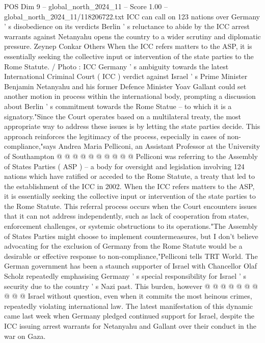 \begin{textsample}{POS Dim 9 – global\_north\_2024\_11 – Score 1.00 – global\_north\_2024\_11/118206722.txt}  \label{ex:f9_pos_244}
ICC can call on 123 nations over Germany ' s disobedience on its verdicts Berlin ' s reluctance to abide by the ICC arrest warrants against Netanyahu opens the country to a wider scrutiny and diplomatic pressure.
Zeynep Conkar Others When the ICC refers matters to the ASP, it is essentially seeking the collective input or intervention of the state parties to the Rome Statute. / Photo : ICC Germany ' s ambiguity towards the latest International Criminal Court ( ICC ) verdict against Israel ' s Prime Minister Benjamin Netanyahu and his former Defence Minister Yoav Gallant could set another motion in process within the international body, prompting a discussion about Berlin ' s commitment towards the Rome Statue -- to which it is a signatory."Since the Court operates based on a multilateral treaty, the most appropriate way to address these issues is by letting the state parties decide.
This approach reinforces the legitimacy of the process, especially in cases of non-compliance,"says Andrea Maria Pelliconi, an Assistant Professor at the University of Southampton @ @ @ @ @ @ @ @ @ @ Pelliconi was referring to the Assembly of States Parties ( ASP ) -- a body for oversight and legislation involving 124 nations which have ratified or acceded to the Rome Statute, a treaty that led to the establishment of the ICC in 2002.
When the ICC refers matters to the ASP, it is essentially seeking the collective input or intervention of the state parties to the Rome Statute.
This referral process occurs when the Court encounters issues that it can not address independently, such as lack of cooperation from states, enforcement challenges, or systemic obstructions to its operations."The Assembly of States Parties might choose to implement countermeasures, but I don't believe advocating for the exclusion of Germany from the Rome Statute would be a desirable or effective response to non-compliance,"Pelliconi tells TRT World.
The German government has been a staunch supporter of Israel with Chancellor Olaf Scholz repeatedly emphasising Germany ' s special responsibility for Israel ' s security due to the country ' s Nazi past.
This burden, however @ @ @ @ @ @ @ @ @ @ Israel without question, even when it commits the most heinous crimes, repeatedly violating international law.
The latest manifestation of this dynamic came last week when Germany pledged continued support for Israel, despite the ICC issuing arrest warrants for Netanyahu and Gallant over their conduct in the war on Gaza.

\end{textsample}
